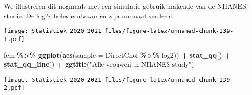 \documentclass[
  12pt,dutch,coursenotes]{book}
\newenvironment{Shaded}{\begin{snugshade}}{\end{snugshade}}
\newcommand{\DataTypeTok}[1]{\textcolor[rgb]{0.13,0.29,0.53}{#1}}
\newcommand{\KeywordTok}[1]{\textcolor[rgb]{0.13,0.29,0.53}{\textbf{#1}}}
\newcommand{\NormalTok}[1]{#1}
\newcommand{\OperatorTok}[1]{\textcolor[rgb]{0.81,0.36,0.00}{\textbf{#1}}}
\newcommand{\StringTok}[1]{\textcolor[rgb]{0.31,0.60,0.02}{#1}}
\theoremstyle{definition}
\theoremstyle{definition}
\theoremstyle{definition}
\theoremstyle{remark}
\begin{document}
We illustreren dit nogmaals met een simulatie gebruik makende van de NHANES-studie.
De log2-cholesterolwaarden zijn normaal verdeeld.

\begin{Shaded}
\end{Shaded}

\texttt{[image: Statistiek\_2020\_2021\_files/figure-latex/unnamed-chunk-139-1.pdf]}

\begin{Shaded}
\begin{Highlighting}[]
\NormalTok{fem }\OperatorTok{\%\textgreater{}\%}\StringTok{ }\KeywordTok{ggplot}\NormalTok{(}\KeywordTok{aes}\NormalTok{(}\DataTypeTok{sample =}\NormalTok{ DirectChol }\OperatorTok{\%\textgreater{}\%}\StringTok{ }\NormalTok{log2)) }\OperatorTok{+}\StringTok{ }
\StringTok{    }\KeywordTok{stat\_qq}\NormalTok{() }\OperatorTok{+}\StringTok{ }\KeywordTok{stat\_qq\_line}\NormalTok{() }\OperatorTok{+}\StringTok{ }\KeywordTok{ggtitle}\NormalTok{(}\StringTok{"Alle vrouwen in NHANES study"}\NormalTok{)}
\end{Highlighting}
\end{Shaded}

\texttt{[image: Statistiek\_2020\_2021\_files/figure-latex/unnamed-chunk-139-2.pdf]}
\end{document}
